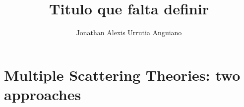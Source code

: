 \documentclass[11pt]{Latex/Classes/PhDthesisPSnPDF}
\author{Jonathan Alexis Urrutia Anguiano}
\title{Titulo que falta definir}
\begin{document}
%
\maketitle

%
\setcounter{secnumdepth}{3} %
\setcounter{tocdepth}{3}    %
 
\tableofcontents            %


\mainmatter
\def\baselinestretch{1}                   %

%
%	
%		


\chapter{Multiple Scattering Theories: two approaches}
 	\label{ch:OpticalProperties}
	
	
\end{document}
